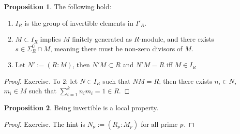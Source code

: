 \documentclass{article}
\theoremstyle{definition}
\theoremstyle{definition}
\theoremstyle{definition}
\newtheorem{proposition}{Proposition}[section]
\theoremstyle{definition}
\theoremstyle{definition}
\theoremstyle{definition}
\theoremstyle{definition}
\begin{document}
\begin{tcolorbox}[colback=blue!5!white,colframe=blue!30!white]
\begin{proposition}
The following hold:
\begin{enumerate}
    \item $I_R$ is the group of invertible elements in $I'_R$. 
    \item $M\subset I_R$ implies $M$ finitely generated as $R$-module, and there exists $s\in \Sigma_R^{0}\cap M$, meaning there must be non-zero divisors of $M$. 
    \item Let $N':=(R: M)$, then $N'M\subset R$ and $N'M=R$ iff $M\in I_R$ 
\end{enumerate}
\end{proposition}
\end{tcolorbox}
\begin{proof}
    Exercise. To $2$: let $N\in I_R$ such that $NM=R$; then there exists $n_i\in N$, $m_i\in M$ such that $\sum_{i=1}^{k}n_im_i=1\in R$.  
\end{proof}


\begin{tcolorbox}[colback=blue!5!white,colframe=blue!30!white]
\begin{proposition}
Being invertible is a local property. 
\end{proposition}
\end{tcolorbox}
\begin{proof}
    Exercise. The hint is $N_p:=(R_p: M_p)$ for all prime $p$. 
\end{proof}
\end{document}
